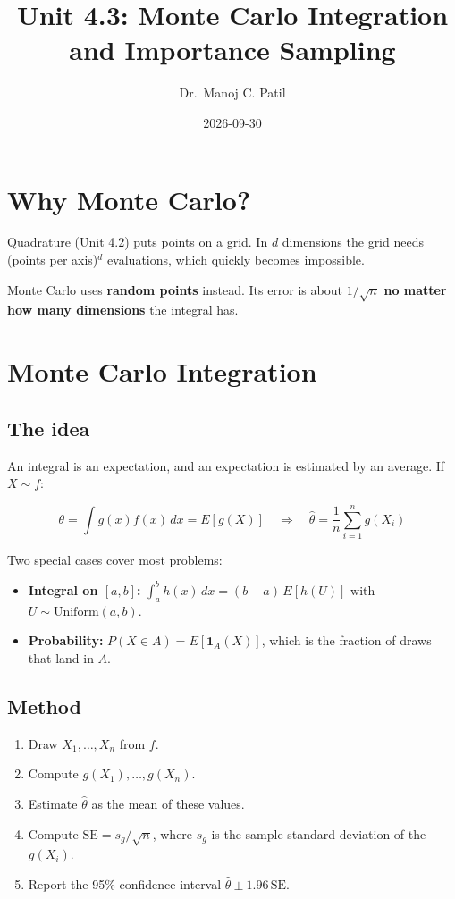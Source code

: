\documentclass[
]{article}
\title{Unit 4.3: Monte Carlo Integration and Importance Sampling}
\author{Dr.~Manoj C. Patil}
\date{2026-09-30}
\providecommand{\tightlist}{%
  \setlength{\itemsep}{0pt}\setlength{\parskip}{0pt}}
\begin{document}
\maketitle

\section{Why Monte Carlo?}\label{why-monte-carlo}

Quadrature (Unit 4.2) puts points on a grid. In \(d\) dimensions the
grid needs (points per axis)\(^d\) evaluations, which quickly becomes
impossible.

Monte Carlo uses \textbf{random points} instead. Its error is about
\(1/\sqrt n\) \textbf{no matter how many dimensions} the integral has.

\section{Monte Carlo Integration}\label{monte-carlo-integration}

\subsection{The idea}\label{the-idea}

An integral is an expectation, and an expectation is estimated by an
average. If \(X \sim f\):

\[
\theta = \int g(x) f(x)\,dx = E[g(X)]
\quad\Longrightarrow\quad
\hat\theta = \frac{1}{n}\sum_{i=1}^n g(X_i)
\]

Two special cases cover most problems:

\begin{itemize}
\tightlist
\item
  \textbf{Integral on \([a,b]\):} \(\int_a^b h(x)\,dx = (b-a)\,E[h(U)]\)
  with \(U \sim \text{Uniform}(a,b)\).
\item
  \textbf{Probability:} \(P(X \in A) = E[\mathbf 1_A(X)]\), which is the
  fraction of draws that land in \(A\).
\end{itemize}

\subsection{Method}\label{method}

\begin{enumerate}
\def\labelenumi{\arabic{enumi}.}
\tightlist
\item
  Draw \(X_1,\dots,X_n\) from \(f\).
\item
  Compute \(g(X_1),\dots,g(X_n)\).
\item
  Estimate \(\hat\theta\) as the mean of these values.
\item
  Compute \(\text{SE} = s_g/\sqrt n\), where \(s_g\) is the sample
  standard deviation of the \(g(X_i)\).
\item
  Report the 95\% confidence interval
  \(\hat\theta \pm 1.96\,\text{SE}\).
\end{enumerate}
\end{document}
